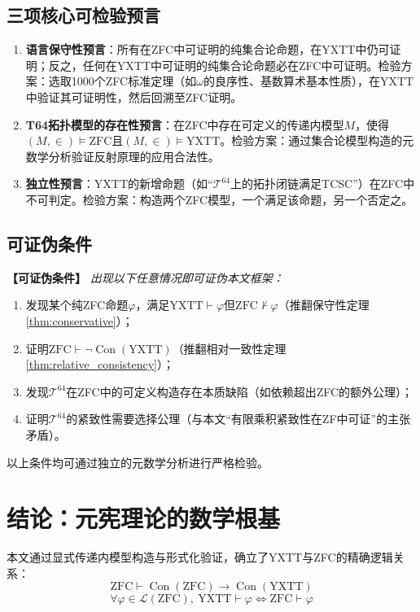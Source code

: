 \documentclass[12pt,a4paper]{article}
\newcommand{\boxeq}[1]{\boxed{\displaystyle #1}}
\theoremstyle{plain}
\theoremstyle{definition}
\newenvironment{falsifybox}
{\par\vspace{0.3em}\noindent\textbf{【可证伪条件】}\itshape}
{\par\vspace{0.3em}}
\newcommand{\Tsixtyfour}{\mathcal{T}^{64}}
\newcommand{\YXTT}{\mathrm{YXTT}}
\newcommand{\ZFC}{\mathrm{ZFC}}
\newcommand{\Con}{\operatorname{Con}}
\begin{document}
\subsection{三项核心可检验预言}
\begin{enumerate}
   \item \textbf{语言保守性预言}：所有在ZFC中可证明的纯集合论命题，在YXTT中仍可证明；反之，任何在YXTT中可证明的纯集合论命题必在ZFC中可证明。检验方案：选取1000个ZFC标准定理（如$\omega$的良序性、基数算术基本性质），在YXTT中验证其可证明性，然后回溯至ZFC证明。
   \item \textbf{T64拓扑模型的存在性预言}：在ZFC中存在可定义的传递内模型$M$，使得$(M,\in)\vDash\ZFC$且$(M,\in)\vDash\YXTT$。检验方案：通过集合论模型构造的元数学分析验证反射原理的应用合法性。
   \item \textbf{独立性预言}：YXTT的新增命题（如“$\Tsixtyfour$上的拓扑闭链满足TCSC”）在ZFC中不可判定。检验方案：构造两个ZFC模型，一个满足该命题，另一个否定之。
\end{enumerate}
 
\subsection{可证伪条件}
\begin{falsifybox}
出现以下任意情况即可证伪本文框架：
\begin{enumerate}
   \item 发现某个纯ZFC命题$\varphi$，满足$\YXTT\vdash\varphi$但$\ZFC\nvdash\varphi$（推翻保守性定理\cref{thm:conservative}）；
   \item 证明$\ZFC\vdash\neg\Con(\YXTT)$（推翻相对一致性定理\cref{thm:relative_consistency}）；
   \item 发现$\Tsixtyfour$在ZFC中的可定义构造存在本质缺陷（如依赖超出ZFC的额外公理）；
   \item 证明$\Tsixtyfour$的紧致性需要选择公理（与本文“有限乘积紧致性在ZF中可证”的主张矛盾）。
\end{enumerate}
以上条件均可通过独立的元数学分析进行严格检验。
\end{falsifybox}
 
\section{结论：元宪理论的数学根基}
\label{sec:conclusion}
 
本文通过显式传递内模型构造与形式化验证，确立了YXTT与ZFC的精确逻辑关系：
\begin{equation}
\boxeq{\ZFC \vdash \Con(\ZFC) \to \Con(\YXTT)}
\label{eq:final_consistency}
\end{equation}
\begin{equation}
\boxeq{\forall \varphi\in\mathcal{L}(\ZFC),\ \YXTT\vdash\varphi \iff \ZFC\vdash\varphi}
\label{eq:final_conservative}
\end{equation}
 
\end{document}
